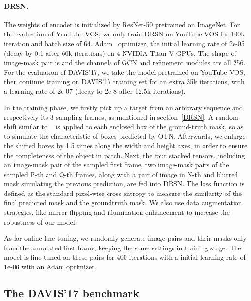 \documentclass[10pt,twocolumn,letterpaper]{article}
\begin{document}
\paragraph{DRSN.} The weights of encoder is initialized by ResNet-50 pretrained on ImageNet. For the evaluation of YouTube-VOS, we only train DRSN on YouTube-VOS for 100k iteration and batch size of 64. Adam~\cite{kingma2014adam} optimizer, the initial learning rate of 2e-05 (decay by 0.1 after 60k iterations) on 4 NVIDIA Titan V GPUs. The shape of image-mask pair is  and the channels of GCN and refinement modules are all 256. For the evaluation of DAVIS'17, we take the model pretrained on YouTube-VOS, then continue training on DAVIS'17 training set for an extra 35k iterations, with a learning rate of 2e-07 (decay to 2e-8 after 12.5k iterations).

In the training phase, we firstly pick up a target from an arbitrary sequence and respectively its 3 sampling frames, as mentioned in section~\ref{DRSN}. A random shift similar to ~\cite{goturn_eccv16} is applied to each enclosed box of the ground-truth mask, so as to simulate the characteristic of boxes predicted by OTN. Afterwards, we enlarge the shifted boxes by 1.5 times along the width and height axes, in order to ensure the completeness of the object in patch. Next, the four stacked tensors, including an image-mask pair of the sampled first frame, two image-mask pairs of the sampled P-th and Q-th frames, along with a pair of image in N-th and blurred mask simulating the previous prediction, are fed into DRSN. The loss function is defined as the standard pixel-wise cross entropy to measure the similarity of the final predicted mask and the groundtruth mask. We also use data augmentation strategies, like mirror flipping and illumination enhancement to increase the robustness of our model.

As for online fine-tuning, we randomly generate image pairs and their masks only from the annotated first frame, keeping the same settings in training stage. The model is fine-tuned on these pairs for 400 iterations with a initial learning rate of 1e-06 with an Adam optimizer.



\subsection{The DAVIS'17 benchmark} \label{exp_davis}
\end{document}
